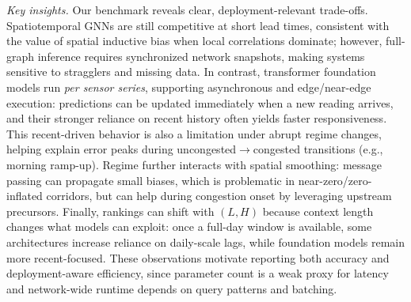 \documentclass[10pt]{article}
\begin{document}



\textit{Key insights.}
Our benchmark reveals clear, deployment-relevant trade-offs. Spatiotemporal GNNs are still competitive at short lead
times, consistent with the value of spatial inductive bias when local correlations dominate; however, full-graph
inference requires synchronized network snapshots, making systems sensitive to stragglers and missing data. In
contrast, transformer foundation models run \emph{per sensor series}, supporting asynchronous and edge/near-edge
execution: predictions can be updated immediately when a new reading arrives, and their stronger reliance on recent
history often yields faster responsiveness. This recent-driven behavior is also a limitation under abrupt regime
changes, helping explain error peaks during uncongested$\rightarrow$congested transitions (e.g., morning ramp-up).
Regime further interacts with spatial smoothing: message passing can propagate small biases, which is problematic in
near-zero/zero-inflated corridors, but can help during congestion onset by leveraging upstream precursors. Finally,
rankings can shift with $(L,H)$ because context length changes what models can exploit: once a full-day window is
available, some architectures increase reliance on daily-scale lags, while foundation models remain more
recent-focused. These observations motivate reporting both accuracy and deployment-aware efficiency, since parameter
count is a weak proxy for latency and network-wide runtime depends on query patterns and batching.
\end{document}
